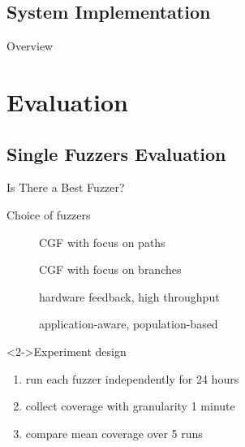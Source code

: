 \documentclass[\HandoutMode,table]{beamer}
\begin{document}
\subsection{System Implementation}

\begin{frame}{Overview}
\end{frame}

\section{Evaluation}

\subsection{Single Fuzzers Evaluation}

\begin{frame}{Is There a Best Fuzzer?}
    \begin{block}{Choice of fuzzers}
        \begin{description}
            \item[\aflfast] CGF with focus on paths
            \item[\fairfuzz] CGF with focus on branches
            \item[\honggfuzz] hardware feedback, high throughput
            \item[\vuzzer] application-aware, population-based
        \end{description}
    \end{block}
    \begin{block}<2->{Experiment design}
        \begin{enumerate}
            \item{} run each fuzzer independently for 24 hours
            \item{} collect coverage with granularity 1 minute
            \item{} compare mean coverage over 5 runs
        \end{enumerate}
    \end{block}
\end{frame}
\end{document}
